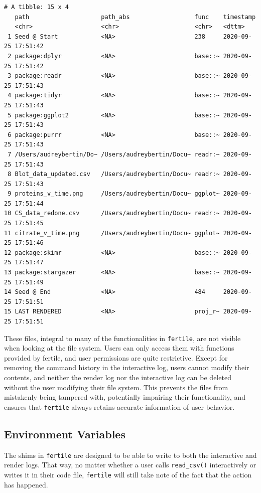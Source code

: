 \documentclass[12pt,twoside]{reedthesis}
\begin{document}
\begin{verbatim}
# A tibble: 15 x 4
   path                    path_abs                  func    timestamp          
   <chr>                   <chr>                     <chr>   <dttm>             
 1 Seed @ Start            <NA>                      238     2020-09-25 17:51:42
 2 package:dplyr           <NA>                      base::~ 2020-09-25 17:51:42
 3 package:readr           <NA>                      base::~ 2020-09-25 17:51:43
 4 package:tidyr           <NA>                      base::~ 2020-09-25 17:51:43
 5 package:ggplot2         <NA>                      base::~ 2020-09-25 17:51:43
 6 package:purrr           <NA>                      base::~ 2020-09-25 17:51:43
 7 /Users/audreybertin/Do~ /Users/audreybertin/Docu~ readr:~ 2020-09-25 17:51:43
 8 Blot_data_updated.csv   /Users/audreybertin/Docu~ readr:~ 2020-09-25 17:51:43
 9 proteins_v_time.png     /Users/audreybertin/Docu~ ggplot~ 2020-09-25 17:51:44
10 CS_data_redone.csv      /Users/audreybertin/Docu~ readr:~ 2020-09-25 17:51:45
11 citrate_v_time.png      /Users/audreybertin/Docu~ ggplot~ 2020-09-25 17:51:46
12 package:skimr           <NA>                      base::~ 2020-09-25 17:51:47
13 package:stargazer       <NA>                      base::~ 2020-09-25 17:51:49
14 Seed @ End              <NA>                      484     2020-09-25 17:51:51
15 LAST RENDERED           <NA>                      proj_r~ 2020-09-25 17:51:51
\end{verbatim}
These files, integral to many of the functionalities in
\texttt{fertile}, are not visible when looking at the file system. Users
can only access them with functions provided by fertile, and user
permissions are quite restrictive. Except for removing the command
history in the interactive log, users cannot modify their contents, and
neither the render log nor the interactive log can be deleted without
the user modifying their file system. This prevents the files from
mistakenly being tampered with, potentially impairing their
functionality, and ensures that \texttt{fertile} always retains accurate
information of user behavior.

\subsection{Environment Variables}\label{environment-variables}

The shims in \texttt{fertile} are designed to be able to write to both
the interactive and render logs. That way, no matter whether a user
calls \texttt{read\_csv()} interactively or writes it in their code
file, \texttt{fertile} will still take note of the fact that the action
has happened.
\end{document}

